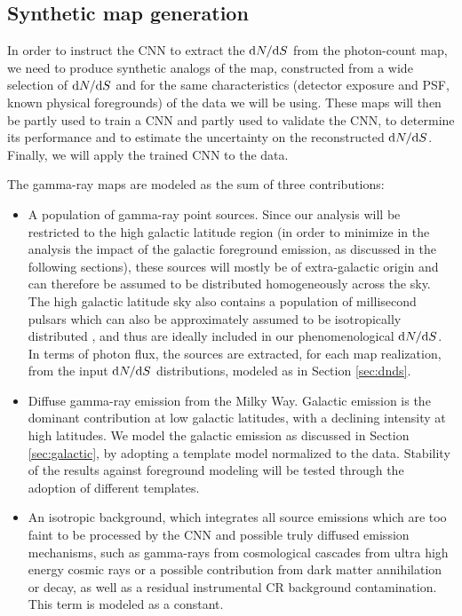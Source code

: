 \subsection{Synthetic map generation}
\label{sec:generation}

In order to instruct the CNN to extract the $\text{d}N/\text{d}S$ from the \fermi photon-count map, we need to produce synthetic analogs of the map, constructed from a wide selection of $\text{d}N/\text{d}S$ and for the same characteristics (detector exposure and PSF, known physical foregrounds) of the data we will be using. These maps will then be partly used to train a CNN and partly used to validate the CNN, to determine its performance and to
estimate the uncertainty on the reconstructed $\text{d}N/\text{d}S$. Finally, we will apply the trained CNN to the \fermi data. 

The gamma-ray maps are modeled as the sum of three contributions:
\begin{itemize}
\item A population of gamma-ray point sources. Since our analysis will be restricted to the high galactic latitude region (in order to minimize in the analysis the impact of the galactic foreground emission, as discussed in the following sections), these sources will mostly be of extra-galactic origin and can therefore be assumed to be distributed homogeneously across the sky. 
The high galactic latitude sky also contains a population of millisecond pulsars which can also be approximately assumed to be isotropically distributed \cite{Fermi-LAT:2013svs}, and thus are ideally included in our phenomenological $\text{d}N/\text{d}S$.
In terms of photon flux, the sources are extracted, for each map realization, from the input $\text{d}N/\text{d}S$ distributions, modeled as in Section \ref{sec:dnds}.

\item Diffuse gamma-ray emission from the Milky Way. Galactic emission is the dominant contribution at low galactic latitudes, with a declining intensity at high latitudes. We model the galactic emission as discussed in Section \ref{sec:galactic}, by adopting a template model normalized to the \fermi data. 
Stability of the results against foreground modeling will be tested through the adoption of different templates.

\item An isotropic background, which integrates all source emissions which are too faint to be processed by the CNN and possible truly diffused emission mechanisms, such as gamma-rays from cosmological cascades from ultra high energy cosmic rays or a possible contribution from dark matter annihilation or decay, as well as a residual instrumental CR background contamination. This term is modeled as a constant.

\end{itemize}
